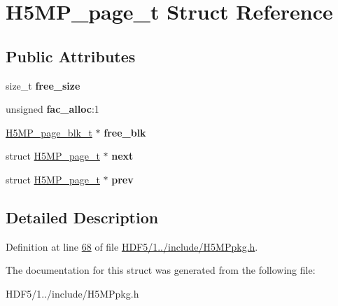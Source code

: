 \hypertarget{struct_h5_m_p__page__t}{}\section{H5\+M\+P\+\_\+page\+\_\+t Struct Reference}
\label{struct_h5_m_p__page__t}
\subsection*{Public Attributes}
\begin{DoxyCompactItemize}
\item 
\mbox{\label{struct_h5_m_p__page__t_a1702f61c82d59a9006f0f04383ea70bd}} 
size\+\_\+t {\bfseries free\+\_\+size}
\item 
\mbox{\label{struct_h5_m_p__page__t_afd1dd3b8f30f8027f1d5c1e304a3740f}} 
unsigned {\bfseries fac\+\_\+alloc}\+:1
\item 
\mbox{\label{struct_h5_m_p__page__t_ad26444b8e6418ffc5f0b3500ae9dab17}} 
\hyperlink{struct_h5_m_p__page__blk__t}{H5\+M\+P\+\_\+page\+\_\+blk\+\_\+t} $\ast$ {\bfseries free\+\_\+blk}
\item 
\mbox{\label{struct_h5_m_p__page__t_af573c8e6d250f9d974713d2d41b6e594}} 
struct \hyperlink{struct_h5_m_p__page__t}{H5\+M\+P\+\_\+page\+\_\+t} $\ast$ {\bfseries next}
\item 
\mbox{\label{struct_h5_m_p__page__t_a804026d830e870010dfd9d60fb488f1c}} 
struct \hyperlink{struct_h5_m_p__page__t}{H5\+M\+P\+\_\+page\+\_\+t} $\ast$ {\bfseries prev}
\end{DoxyCompactItemize}


\subsection{Detailed Description}


Definition at line \hyperlink{_h_d_f5_21_810_81_2include_2_h5_m_ppkg_8h_source_l00068}{68} of file \hyperlink{_h_d_f5_21_810_81_2include_2_h5_m_ppkg_8h_source}{H\+D\+F5/1../include/\+H5\+M\+Ppkg.\+h}.



The documentation for this struct was generated from the following file\+:\begin{DoxyCompactItemize}
\item 
H\+D\+F5/1../include/\+H5\+M\+Ppkg.\+h\end{DoxyCompactItemize}
